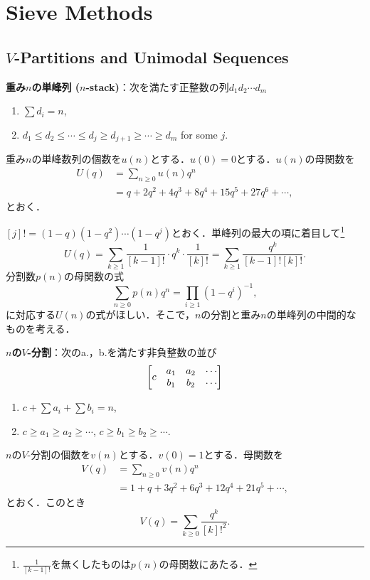\documentclass[xelatex,ja=standard,a4paper,14pt,everyparhook=compat]{bxjsarticle}
\newcommand{\up}[1]{\smash{\raisebox{.5\normalbaselineskip}{$#1$}}}
\theoremstyle{definition}
\begin{document}
\setcounter{section}{1}
\section{Sieve Methods}
\setcounter{subsection}{4}
\subsection{$V$-Partitions and Unimodal Sequences}

\textbf{重み$n$の単峰列 ($n$-stack)}：次を満たす正整数の列$d_1 d_2 \cdots d_m$ \begin{enumerate}[label=\alph*.]
    \item $\sum d_i = n$,
    \item $d_1 \leq d_2 \leq \cdots \leq d_j \geq d_{j+1} \geq \cdots \geq d_m$ for some $j$.
\end{enumerate}
重み$n$の単峰数列の個数を$u(n)$とする．$u(0) = 0$とする．$u(n)$の母関数を \begin{align*}
    U(q) & = \sum_{n \geq 0} u(n) q^n                         \\
         & = q + 2q^2 + 4q^3 + 8q^4 + 15q^5 + 27q^6 + \cdots,
\end{align*}
とおく．

$[j]! = (1-q)(1-q^2) \cdots (1-q^j)$とおく．単峰列の最大の項に着目して\footnote{$\frac{1}{[k-1]!}$を無くしたものは$p(n)$の母関数にあたる．} \begin{equation*}
    U(q) = \sum_{k \geq 1} \frac{1}{[k-1]!} \cdot q^k \cdot \frac{1}{[k]!} = \sum_{k \geq 1} \frac{q^k}{[k-1]![k]!}.
\end{equation*}
分割数$p(n)$の母関数の式 \begin{equation*}
    \sum_{n \geq 0} p(n) q^n = \prod_{i \geq 1} (1-q^i)^{-1},
\end{equation*}
に対応する$U(n)$の式がほしい．そこで，$n$の分割と重み$n$の単峰列の中間的なものを考える．

\newpage

\textbf{$n$の$V$-分割}：次のa.，b.を満たす非負整数の並び \begin{equation*}
    \begin{bmatrix}
               & a_1 & a_2 & \cdots \\
        \up{c} & b_1 & b_2 & \cdots
    \end{bmatrix}
\end{equation*}
\begin{enumerate}[label=\alph*.]
    \item $c + \sum a_i + \sum b_i = n$,
    \item $c \geq a_1 \geq a_2 \geq \cdots$, $c \geq b_1 \geq b_2 \geq \cdots$.
\end{enumerate}
$n$の$V$-分割の個数を$v(n)$とする．$v(0) = 1$とする．母関数を \begin{align*}
    V(q) & = \sum_{n \geq 0} v(n) q^n                      \\
         & = 1 + q + 3q^2 + 6q^3 + 12q^4 + 21q^5 + \cdots,
\end{align*}
とおく．このとき \begin{equation*}
    V(q) = \sum_{k \geq 0} \frac{q^k}{[k]!^2}.
\end{equation*}
\end{document}
